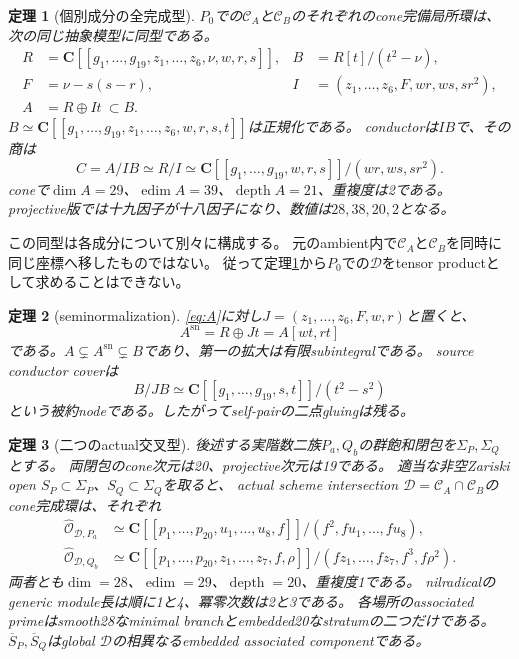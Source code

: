 \documentclass[11pt,a4paper]{ltjsarticle}
\newcommand{\CC}{\mathbf C}
\newcommand{\CA}{\mathcal C_A}
\newcommand{\CB}{\mathcal C_B}
\newcommand{\cD}{\mathcal D}
\newcommand{\gvars}{g_1,\ldots,g_{19}}
\newcommand{\zvars}{z_1,\ldots,z_6}
\newcommand{\sn}{\mathrm{sn}}
\newcommand{\edim}{\operatorname{edim}}
\newcommand{\depth}{\operatorname{depth}}
\newtheorem{theorem}{定理}[section]
\theoremstyle{definition}
\theoremstyle{remark}
\begin{document}
\begin{theorem}[個別成分の全完成型]\label{thm:formal}
$P_0$での$\CA$と$\CB$の\emph{それぞれの}cone完備局所環は、次の同じ抽象模型に同型である。
\begin{align}
 R&=\CC[[\gvars,\zvars,\nu,w,r,s]],&
 B&=R[t]/(t^2-\nu),\label{eq:RB}\\
 F&=\nu-s(s-r),&
 I&=(z_1,\ldots,z_6,F,wr,ws,sr^2),\label{eq:I}\\
 A&=R\oplus It\ \subset B.&&\label{eq:A}
\end{align}
$B\simeq\CC[[\gvars,\zvars,w,r,s,t]]$は正規化である。
conductorは$IB$で、その商は
\begin{equation}\label{eq:C}
 C=A/IB\simeq R/I\simeq
 \CC[[\gvars,w,r,s]]/(wr,ws,sr^2).
\end{equation}
coneで$\dim A=29$、$\edim A=39$、$\depth A=21$、重複度は2である。
projective版では十九因子が十八因子になり、数値は$28,38,20,2$となる。
\end{theorem}

この同型は各成分について別々に構成する。
元のambient内で$\CA$と$\CB$を同時に同じ座標へ移したものではない。
従って定理\ref{thm:formal}から$P_0$での$\cD$をtensor productとして求めることはできない。

\begin{theorem}[seminormalization]\label{thm:sn}
\eqref{eq:A}に対し$J=(z_1,\ldots,z_6,F,w,r)$と置くと、
\[
 A^{\sn}=R\oplus Jt=A[wt,rt]
\]
である。$A\subsetneq A^{\sn}\subsetneq B$であり、第一の拡大は有限subintegralである。
source conductor coverは
\[
 B/JB\simeq\CC[[\gvars,s,t]]/(t^2-s^2)
\]
という被約nodeである。したがってself-pairの二点gluingは残る。
\end{theorem}

\begin{theorem}[二つのactual交叉型]\label{thm:D}
後述する実階数二族$P_a,Q_b$の群飽和閉包を$\Sigma_P,\Sigma_Q$とする。
両閉包のcone次元は20、projective次元は19である。
適当な非空Zariski open $S_P\subset\Sigma_P$、$S_Q\subset\Sigma_Q$を取ると、
actual scheme intersection $\cD=\CA\cap\CB$のcone完成環は、それぞれ
\begin{align}
 \widehat{\mathcal O}_{\cD,P_a}
 &\simeq\CC[[p_1,\ldots,p_{20},u_1,\ldots,u_8,f]]/(f^2,fu_1,\ldots,fu_8),
 \label{eq:DP}\\
 \widehat{\mathcal O}_{\cD,Q_b}
 &\simeq\CC[[p_1,\ldots,p_{20},z_1,\ldots,z_7,f,\rho]]/
 (fz_1,\ldots,fz_7,f^3,f\rho^2).
 \label{eq:DQ}
\end{align}
両者とも$\dim=28$、$\edim=29$、$\depth=20$、重複度1である。
nilradicalのgeneric module長は順に1と4、冪零次数は2と3である。
各場所のassociated primeはsmooth28なminimal branchとembedded20なstratumの二つだけである。
$\overline S_P,\overline S_Q$はglobal $\cD$の相異なるembedded associated componentである。
\end{theorem}
\end{document}
